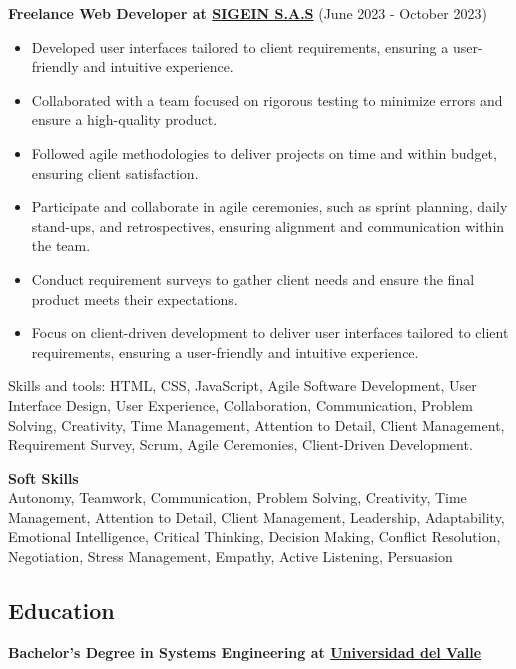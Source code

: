 \vspace*{0.2cm}
\textbf{Freelance Web Developer at \href{}{SIGEIN S.A.S}} (June 2023 - October 2023)
\hfill
\vspace*{0.2cm}
\begin{minipage}{\linewidth}
\begin{itemize}[noitemsep]
    \item Developed user interfaces tailored to client requirements, ensuring a user-friendly and intuitive experience.
    \item Collaborated with a team focused on rigorous testing to minimize errors and ensure a high-quality product.
    \item Followed agile methodologies to deliver projects on time and within budget, ensuring client satisfaction.
    \item Participate and collaborate in agile ceremonies, such as sprint planning, daily stand-ups, and retrospectives, ensuring alignment and communication within the team.
    \item Conduct requirement surveys to gather client needs and ensure the final product meets their expectations.
    \item Focus on client-driven development to deliver user interfaces tailored to client requirements, ensuring a user-friendly and intuitive experience.
\end{itemize}
\hfill
\end{minipage}
Skills and tools: HTML, CSS, JavaScript, Agile Software Development, User Interface Design, User Experience, Collaboration, Communication, Problem Solving, Creativity, Time Management, Attention to Detail, Client Management, Requirement Survey, Scrum, Agile Ceremonies, Client-Driven Development.
\vspace{1cm}

\noindent\makebox[\linewidth]{\rule{\textwidth}{0.4pt}}

\vspace*{0.2cm}
\textbf{Soft Skills}\\
Autonomy, Teamwork, Communication, Problem Solving, Creativity, Time Management, Attention to Detail, Client Management, Leadership, Adaptability, Emotional Intelligence, Critical Thinking, Decision Making, Conflict Resolution, Negotiation, Stress Management, Empathy, Active Listening, Persuasion\\

\noindent\makebox[\linewidth]{\rule{\textwidth}{0.4pt}}

\subsection*{Education}
\vspace*{0.2cm}
\textbf{Bachelor's Degree in Systems Engineering at \href{https://www.univalle.edu.co/}{Universidad del Valle}} \hfill

